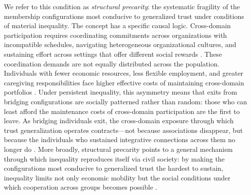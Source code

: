 We refer to this condition as \textit{structural precarity}: the systematic fragility of the membership configurations most conducive to generalized trust under conditions of material inequality. The concept has a specific causal logic. Cross-domain participation requires coordinating commitments across organizations with incompatible schedules, navigating heterogeneous organizational cultures, and sustaining effort across settings that offer different social rewards \parencite{simmel_conflict_1922}. These coordination demands are not equally distributed across the population. Individuals with fewer economic resources, less flexible employment, and greater caregiving responsibilities face higher effective costs of maintaining cross-domain portfolios \parencite{oxhorn_neopluralism_2004, cook2005cooperation}. Under persistent inequality, this asymmetry means that exits from bridging configurations are socially patterned rather than random: those who can least afford the maintenance costs of cross-domain participation are the first to leave. As bridging individuals exit, the cross-domain exposure through which trust generalization operates contracts---not because associations disappear, but because the individuals who sustained integrative connections across them no longer do \parencite{wellman_community_1979, fukuyama1996trust}. More broadly, structural precarity points to a general mechanism through which inequality reproduces itself via civil society: by making the configurations most conducive to generalized trust the hardest to sustain, inequality limits not only economic mobility but the social conditions under which cooperation
across groups becomes possible \parencite{dimaggio_network_2012, cook2005cooperation, fukuyama1996trust}.

